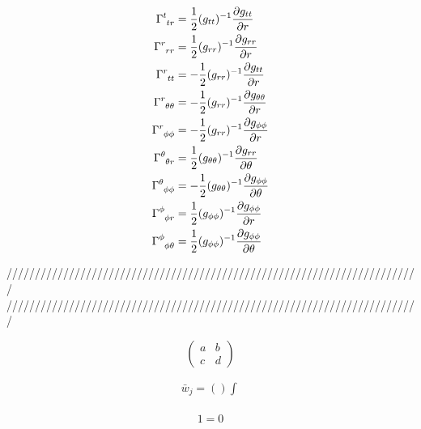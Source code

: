 \documentclass[dvipdfmx]{report} %
\begin{document}
\begin{equation*}
\begin{split}
	\tensor{\Gamma}{^t_{tr}}
		&= \frac{1}{2}(g_{tt})^{-1}\frac{\partial g_{tt}}{\partial r}\\
	\tensor{\Gamma}{^r_{rr}}
		&= \frac{1}{2}(g_{rr})^{-1}\frac{\partial g_{rr}}{\partial r}\\
	\tensor{\Gamma}{^r_{tt}}
		&= - \frac{1}{2}(g_{rr})^{-1}\frac{\partial g_{tt}}{\partial r}\\
	\tensor{\Gamma}{^r_{\theta\theta}}
		&= - \frac{1}{2}(g_{rr})^{-1}\frac{\partial g_{\theta\theta}}{\partial r}\\
	\tensor{\Gamma}{^r_{\phi\phi}}
		&= - \frac{1}{2}(g_{rr})^{-1}\frac{\partial g_{\phi\phi}}{\partial r}\\
	\tensor{\Gamma}{^\theta_{\theta r}}
		&= \frac{1}{2}(g_{\theta\theta})^{-1}\frac{\partial g_{rr}}{\partial \theta}\\
	\tensor{\Gamma}{^\theta_{\phi \phi}}
		&= - \frac{1}{2}(g_{\theta\theta})^{-1}\frac{\partial g_{\phi\phi}}{\partial \theta}\\
	\tensor{\Gamma}{^\phi_{\phi r}}
		&= \frac{1}{2}(g_{\phi\phi})^{-1}\frac{\partial g_{\phi\phi}}{\partial r}\\
	\tensor{\Gamma}{^\phi_{\phi \theta}}
		&= \frac{1}{2}(g_{\phi\phi})^{-1}\frac{\partial g_{\phi\phi}}{\partial \theta}\\
\end{split}
\end{equation*}


/////////////////////////////////////////////////////////////////////////\\
/////////////////////////////////////////////////////////////////////////
\newpage
\noindent

\begin{equation*}
\begin{pmatrix}
   a & b \\
   c & d
\end{pmatrix}
\end{equation*}

\begin{equation*}
\begin{split}
	\bar{w}_j = \left( \right) \int^{}_{}
\end{split}
\end{equation*}

\begin{tcolorbox}[title=メモ用]
\begin{eqnarray*}
	1 = 0
\end{eqnarray*}
\end{tcolorbox}
\end{document}
